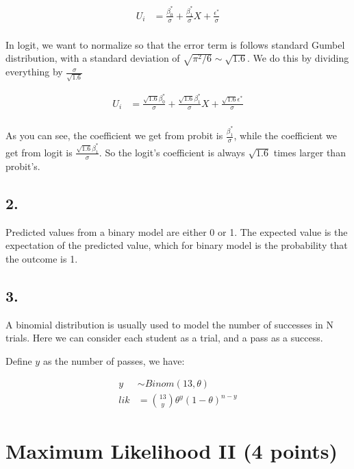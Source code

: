 \documentclass{article}\usepackage[]{graphicx}\usepackage[]{color}
\begin{document}
\begin{align}
U_i &= \frac{\beta_0^*}{\sigma} + \frac{\beta_1^*}{\sigma} X + \frac{\epsilon^*}{\sigma} \\
\end{align}

In logit, we want to normalize so that the error term is follows standard Gumbel distribution, with a standard deviation of $\sqrt{\pi^2 / 6} \sim \sqrt{1.6}$. We do this by dividing everything by $\frac{\sigma}{\sqrt{1.6}}$

\begin{align}
U_i &= \frac{\sqrt{1.6}\beta_0^*}{\sigma} + \frac{\sqrt{1.6}\beta_1^*}{\sigma} X + \frac{\sqrt{1.6}\epsilon^*}{\sigma} \\
\end{align}

As you can see, the coefficient we get from probit is $\frac{\beta_1^*}{\sigma}$, while the coefficient we get from logit is $\frac{\sqrt{1.6}\beta_1^*}{\sigma}$. So the logit's coefficient is always $\sqrt{1.6}$ times larger than probit's.

\subsection*{2.} Predicted values from a binary model are either 0 or 1. The expected value is the expectation of the predicted value, which for binary model is the probability that the outcome is 1.

\subsection*{3.} A binomial distribution is usually used to model the number of successes in N trials. Here we can consider each student as a trial, and a pass as a success. 

Define $y$ as the number of passes, we have:

\begin{align}
y &\sim Binom(13, \theta) \\
lik &= {13 \choose y} \theta^y (1 - \theta)^{n - y}
\end{align}

\section*{Maximum Likelihood II (4 points)}
\end{document}
